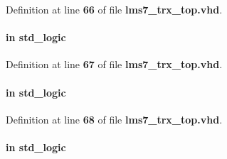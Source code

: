 Definition at line {\bf 66} of file {\bf lms7\+\_\+trx\+\_\+top.\+vhd}.

\paragraph[{S\+I\+\_\+\+C\+L\+K2}]{ {\bfseries \textcolor{keywordflow}{in}\textcolor{vhdlchar}{ }} {\bfseries \textcolor{comment}{std\+\_\+logic}\textcolor{vhdlchar}{ }} \hspace{0.3cm}{\ttfamily [Port]}}\label{classlms7__trx__top_a60aad099425c441d15ba44c22c74d9c1}


Definition at line {\bf 67} of file {\bf lms7\+\_\+trx\+\_\+top.\+vhd}.

\paragraph[{S\+I\+\_\+\+C\+L\+K3}]{ {\bfseries \textcolor{keywordflow}{in}\textcolor{vhdlchar}{ }} {\bfseries \textcolor{comment}{std\+\_\+logic}\textcolor{vhdlchar}{ }} \hspace{0.3cm}{\ttfamily [Port]}}\label{classlms7__trx__top_a937799a5b5cdc53fc96dcb09576fa0fd}


Definition at line {\bf 68} of file {\bf lms7\+\_\+trx\+\_\+top.\+vhd}.

\paragraph[{S\+I\+\_\+\+C\+L\+K5}]{ {\bfseries \textcolor{keywordflow}{in}\textcolor{vhdlchar}{ }} {\bfseries \textcolor{comment}{std\+\_\+logic}\textcolor{vhdlchar}{ }} \hspace{0.3cm}{\ttfamily [Port]}}\label{classlms7__trx__top_adcd4440473fb737927d3a0776c2fef31}


